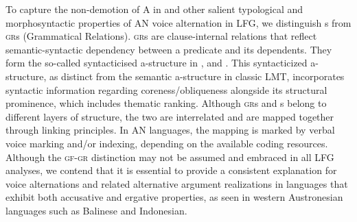 \documentclass[output=paper,chinesefont]{../langscibook}
\begin{document}
To capture the non-demotion of A in \UV and other salient typological and morphosyntactic properties of AN voice alternation in LFG, we distinguish {\GF}s from \textsc{gr}s (Grammatical Relations). \textsc{gr}s are clause-internal relations that reflect semantic-syntactic dependency between a predicate and its dependents. They form the so-called syntacticised a-structure in \citet{Manning1994}, \citet{arka2003} and \citet{Arka2008}. This syntacticized a-structure, as distinct from the semantic a-structure in  classic LMT, incorporates syntactic information regarding coreness/obliqueness alongside its structural prominence, which includes thematic ranking.  Although \textsc{gr}s and {\GF}s belong to different layers of structure, the two are interrelated and are mapped together through linking principles. In AN languages, the mapping is marked by verbal voice marking and/or indexing, depending on the available coding resources. Although the \textsc{gf-gr} distinction may not be assumed and embraced in all LFG analyses, we contend that it is essential to provide a consistent explanation for voice alternations and related alternative argument realizations in languages that exhibit both accusative and ergative properties, as seen in western Austronesian languages such as Balinese and Indonesian. 
\end{document}
